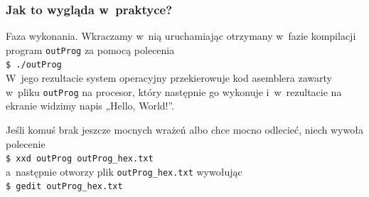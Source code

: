 \documentclass[10pt,t]{beamer}
\begin{document}
\begin{frame}
  \frametitle{Jak to wygląda w~praktyce?}




  \alert{Faza wykonania.} Wkraczamy w~nią uruchamiając otrzymany w~fazie
  kompilacji program \texttt{outProg} za pomocą polecenia \\
  \texttt{\$ ./outProg} \\
  W~jego rezultacie system operacyjny przekierowuje kod asemblera
  zawarty w~pliku \texttt{outProg} na procesor, który następnie go wykonuje
  i~w~rezultacie na ekranie widzimy napis „Hello, World!”.

  Jeśli komuś brak jeszcze mocnych wrażeń albo chce mocno odlecieć, niech
  wywoła polecenie \\
  \texttt{\$ xxd outProg outProg\_hex.txt} \\
  a~następnie otworzy plik \texttt{outProg\_hex.txt} wywołując \\
  \texttt{\$ gedit outProg\_hex.txt}

\end{frame}
\end{document}
